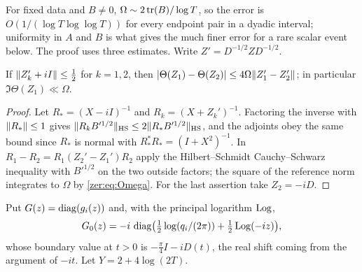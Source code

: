 For fixed data and $B\ne0$, $\Omega\sim2\operatorname{tr}(B)/\log T$, so the error is $O(1/(\log T\log\log T))$ for every
endpoint pair in a dyadic interval; uniformity in $A$ and $B$ is what gives the much finer error for a rare
scalar event below. The proof uses three estimates. Write $Z'=D^{-1/2}ZD^{-1/2}$.

\begin{lemma}\label{zer:lem:resolvent}
If $\lVert Z_k'+iI\rVert\le\tfrac12$ for $k=1,2$, then $\lvert\Theta(Z_1)-\Theta(Z_2)\rvert\le4\Omega\lVert Z_1'-Z_2'\rVert$; in
particular $\Im\Theta(Z_1)\ll\Omega$.
\end{lemma}
\begin{proof}
Let $R_*=(X-iI)^{-1}$ and $R_k=(X+Z_k')^{-1}$. Factoring the inverse with $\lVert R_*\rVert\le1$ gives
$\lVert R_kB'^{1/2}\rVert_{\mathrm{HS}}\le2\lVert R_*B'^{1/2}\rVert_{\mathrm{HS}}$, and the adjoints obey the same bound since
$R_*$ is normal with $R_*^*R_*=(I+X^2)^{-1}$. In $R_1-R_2=R_1(Z_2'-Z_1')R_2$ apply the Hilbert--Schmidt
Cauchy--Schwarz inequality with $B'^{1/2}$ on the two outside factors; the square of the reference norm
integrates to $\Omega$ by \eqref{zer:eq:Omega}. For the last assertion take $Z_2=-iD$.
\end{proof}

Put $G(z)=\operatorname{diag}(g_i(z))$ and, with the principal logarithm $\operatorname{Log}$,
\[G_0(z)=-i\,\operatorname{diag}\bigl(\tfrac12\log(q_i/(2\pi))+\tfrac12\operatorname{Log}(-iz)\bigr),\]
whose boundary value at $t>0$ is
$-\tfrac\pi4I-iD(t)$, the real shift coming from the argument of $-it$. Let $Y=2+4\log(2T)$.

